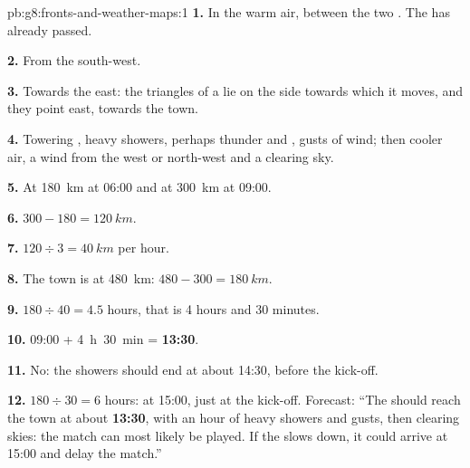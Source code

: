 \begin{solution}{pb:g8:fronts-and-weather-maps:1}
\textbf{1.} In the warm air, between the two . The  has
already passed.

\textbf{2.} From the south-west.

\textbf{3.} Towards the east: the triangles of a  lie on the
side towards which it moves, and they point east, towards the town.

\textbf{4.} Towering , heavy showers, perhaps thunder and ,
gusts of wind; then cooler air, a wind from the west or north-west and a
clearing sky.

\textbf{5.} At \qty{180}{km} at 06:00 and at \qty{300}{km} at 09:00.

\textbf{6.} $300 - 180 = \qty{120}{km}$.

\textbf{7.} $120 \div 3 = \qty{40}{km}$ per hour.

\textbf{8.} The town is at \qty{480}{km}: $480 - 300 = \qty{180}{km}$.

\textbf{9.} $180 \div 40 = 4.5$ hours, that is 4 hours and 30 minutes.

\textbf{10.} 09:00 + 4~h~30~min = \textbf{13:30}.

\textbf{11.} No: the showers should end at about 14:30, before the
kick-off.

\textbf{12.} $180 \div 30 = 6$ hours: at 15:00, just at the kick-off.
Forecast: ``The  should reach the town at about \textbf{13:30},
with an hour of heavy showers and gusts, then clearing skies: the match
can most likely be played. If the  slows down, it could arrive at
15:00 and delay the match.''
\end{solution}
